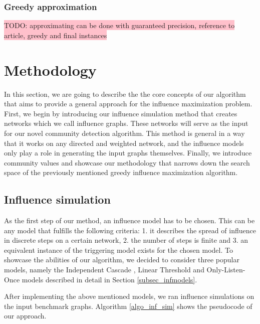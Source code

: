 \documentclass[pdflatex,sn-mathphys-num]{sn-jnl}
\begin{document}
\subsubsection{Greedy approximation}\label{subsec_greedy_approx}

\colorbox{pink}{TODO: approximating can be done with guaranteed precision, reference to article, greedy and final instances}


\section{Methodology}\label{sec_methodology}

In this section, we are going to describe the the core concepts of our algorithm that aims to provide a general approach for the influence maximization problem. First, we begin by introducing our influence simulation method that creates networks which we call influence graphs. These networks will serve as the input for our novel community detection algorithm. This method is general in a way that it works on any directed and weighted network, and the influence models only play a role in generating the input graphs themselves. Finally, we introduce community values and showcase our methodology that narrows down the search space of the previously mentioned greedy influence maximization algorithm.


\subsection{Influence simulation}\label{subsec_infsim}

As the first step of our method, an influence model has to be chosen. This can be any model that fulfills the following criteria: 1. it describes the spread of influence in discrete steps on a certain network, 2. the number of steps is finite and 3. an equivalent instance of the triggering model exists \cite{kempe} for the chosen model. To showcase the abilities of our algorithm, we decided to consider three popular models, namely the Independent Cascade \cite{domingos, kempe}, Linear Threshold \cite{granovetter, kempe} and Only-Listen-Once models \cite{kempe} described in detail in Section \ref{subsec_infmodels}.

After implementing the above mentioned models, we ran influence simulations on the input benchmark graphs. Algorithm \ref{algo_inf_sim} shows the pseudocode of our approach.
\end{document}
